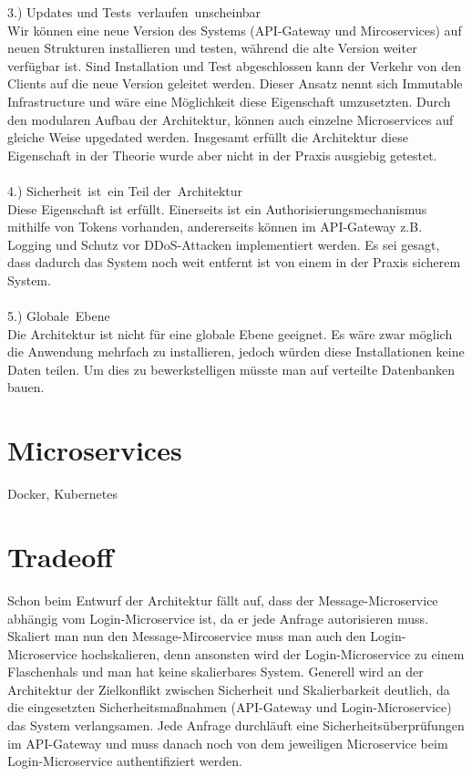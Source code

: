 3.) Updates und Tests verlaufen unscheinbar\\
Wir können eine neue Version des Systems (API-Gateway und Mircoservices) auf neuen Strukturen installieren und testen, während die alte Version weiter verfügbar ist. Sind Installation und Test abgeschlossen kann der Verkehr von den Clients auf die neue Version geleitet werden. Dieser Ansatz nennt sich Immutable Infrastructure und wäre eine Möglichkeit diese Eigenschaft umzusetzten. Durch den modularen Aufbau der Architektur, können auch einzelne Microservices auf gleiche Weise upgedated werden. Insgesamt erfüllt die Architektur diese Eigenschaft in der Theorie wurde aber nicht in der Praxis ausgiebig getestet.\\
\\
4.) Sicherheit ist ein Teil der Architektur\\
Diese Eigenschaft ist erfüllt. Einerseits ist ein Authorisierungsmechanismus mithilfe von Tokens vorhanden, andererseits können im API-Gateway z.B. Logging und Schutz vor DDoS-Attacken implementiert werden. Es sei gesagt, dass dadurch das System noch weit entfernt ist von einem in der Praxis sicherem System.\\
\\
5.) Globale Ebene\\
Die Architektur ist nicht für eine globale Ebene geeignet. Es wäre zwar möglich die Anwendung mehrfach zu installieren, jedoch würden diese Installationen keine Daten teilen. Um dies zu bewerkstelligen müsste man auf verteilte Datenbanken bauen.

\section{Microservices}
 Docker, Kubernetes
 
\section{Tradeoff}
\label{tradeoff}
Schon beim Entwurf der Architektur fällt auf, dass der Message-Microservice abhängig vom Login-Microservice ist, da er jede Anfrage autorisieren muss. Skaliert man nun den Message-Mircoservice muss man auch den Login-Microservice hochskalieren, denn ansonsten wird der Login-Microservice zu einem Flaschenhals und man hat keine skalierbares System. Generell wird an der Architektur der Zielkonflikt zwischen Sicherheit und Skalierbarkeit deutlich, da die eingesetzten Sicherheitsmaßnahmen (API-Gateway und Login-Microservice) das System verlangsamen. Jede Anfrage durchläuft eine Sicherheitsüberprüfungen im API-Gateway und muss danach noch von dem jeweiligen Microservice beim Login-Microservice authentifiziert werden.


